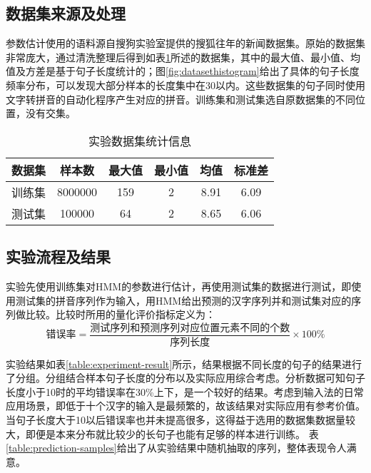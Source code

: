 \documentclass[12pt,a4paper]{ctexart}
\begin{document}
\subsection{数据集来源及处理}
参数估计使用的语料源自搜狗实验室提供的搜狐往年的新闻数据集\cite{SogouCS}。原始的数据集非常庞大，通过清洗整理后得到如表\ref{table:dataset-stat}所述的数据集，其中的最大值、最小值、均值及方差是基于句子长度统计的；图\ref{fig:datasethistogram}给出了具体的句子长度频率分布，可以发现大部分样本的长度集中在30以内。这些数据集的句子同时使用文字转拼音的自动化程序\cite{python-pinyin}产生对应的拼音。训练集和测试集选自原数据集的不同位置，没有交集。
\bigskip
\begin{figure}[H]
	
\end{figure}
\bigskip
\begin{table}[H]
	\centering
\begin{tabular}{cccccc}
	\toprule  %
	数据集 & 样本数 & 最大值 & 最小值& 均值& 标准差\\
	\midrule  %
		训练集 & 8000000       & 159 & 2&8.91 & 6.09\\
测试集 & 100000 & 64 & 2 & 8.65 & 6.06\\
	\bottomrule %
\end{tabular}
\caption{实验数据集统计信息}
\label{table:dataset-stat}
\end{table}
\clearpage
\subsection{实验流程及结果}
实验先使用训练集对HMM的参数进行估计，再使用测试集的数据进行测试，即使用测试集的拼音序列作为输入，用HMM给出预测的汉字序列并和测试集对应的序列做比较。比较时所用的量化评价指标定义为：
\bigskip
\[ \mbox{错误率}=\frac{\mbox{测试序列和预测序列对应位置元素不同的个数}}{\mbox{序列长度}} \times 100\% \]

\bigskip

实验结果如表\ref{table:experiment-result}所示，结果根据不同长度的句子的结果进行了分组。分组结合样本句子长度的分布以及实际应用综合考虑。分析数据可知句子长度小于10时的平均错误率在30\%上下，是一个较好的结果。考虑到输入法的日常应用场景，即低于十个汉字的输入是最频繁的，故该结果对实际应用有参考价值。当句子长度大于10以后错误率也并未提高很多，这得益于选用的数据集数据量较大，即便是本来分布就比较少的长句子也能有足够的样本进行训练。
表\ref{table:prediction-samples}给出了从实验结果中随机抽取的序列，整体表现令人满意。
\bigskip
\bigskip
\end{document}

